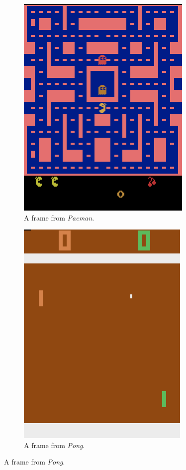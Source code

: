 \documentclass[11pt]{article}
\begin{document}
\begin{figure}[H]
    \begin{subfigure}[b]{.5\textwidth}
        \centering
        \includegraphics[scale=0.75]{include/pacman.png}
        \caption{A frame from \textit{Pacman}.}
    \end{subfigure}
    \begin{subfigure}[b]{.5\textwidth}
        \centering
        \includegraphics[scale=0.75]{include/pong.png}
        \caption{A frame from \textit{Pong}.}
    \end{subfigure}

\end{figure}
\end{document}
